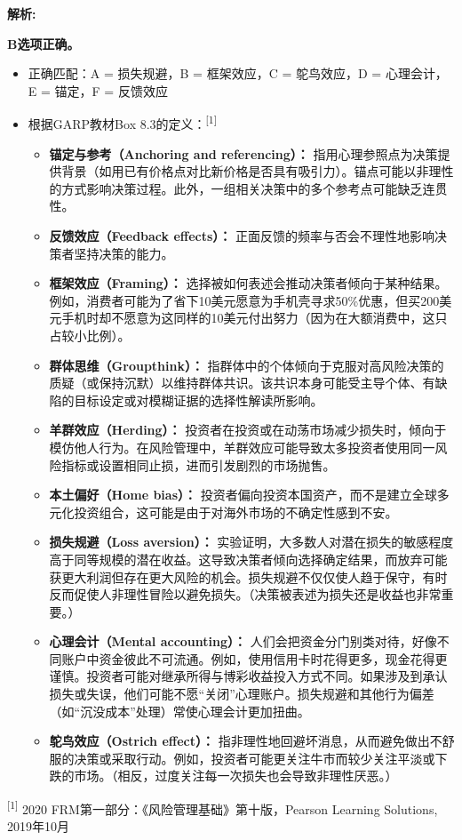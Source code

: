 \documentclass{article}
\newenvironment{explanation}
{\textbf{解析:}\par}
{\par}
\begin{document}
\begin{explanation}
    \textbf{B选项正确。} 
    \begin{itemize}
        \item 正确匹配：A = 损失规避，B = 框架效应，C = 鸵鸟效应，D = 心理会计，E = 锚定，F = 反馈效应
        \item 根据GARP教材Box 8.3的定义：\textsuperscript{[1]}
    
     \begin{itemize}
         \item \textbf{锚定与参考（Anchoring and referencing）：} 指用心理参照点为决策提供背景（如用已有价格点对比新价格是否具有吸引力）。锚点可能以非理性的方式影响决策过程。此外，一组相关决策中的多个参考点可能缺乏连贯性。
         \item \textbf{反馈效应（Feedback effects）：} 正面反馈的频率与否会不理性地影响决策者坚持决策的能力。
        
        \item \textbf{框架效应（Framing）：} 选择被如何表述会推动决策者倾向于某种结果。例如，消费者可能为了省下10美元愿意为手机壳寻求50\%优惠，但买200美元手机时却不愿意为这同样的10美元付出努力（因为在大额消费中，这只占较小比例）。
        \item \textbf{群体思维（Groupthink）：} 指群体中的个体倾向于克服对高风险决策的质疑（或保持沉默）以维持群体共识。该共识本身可能受主导个体、有缺陷的目标设定或对模糊证据的选择性解读所影响。
        \item \textbf{羊群效应（Herding）：} 投资者在投资或在动荡市场减少损失时，倾向于模仿他人行为。在风险管理中，羊群效应可能导致太多投资者使用同一风险指标或设置相同止损，进而引发剧烈的市场抛售。
        \item \textbf{本土偏好（Home bias）：} 投资者偏向投资本国资产，而不是建立全球多元化投资组合，这可能是由于对海外市场的不确定性感到不安。
        \item \textbf{损失规避（Loss aversion）：} 实验证明，大多数人对潜在损失的敏感程度高于同等规模的潜在收益。这导致决策者倾向选择确定结果，而放弃可能获更大利润但存在更大风险的机会。损失规避不仅仅使人趋于保守，有时反而促使人非理性冒险以避免损失。（决策被表述为损失还是收益也非常重要。）
        \item \textbf{心理会计（Mental accounting）：} 人们会把资金分门别类对待，好像不同账户中资金彼此不可流通。例如，使用信用卡时花得更多，现金花得更谨慎。投资者可能对继承所得与博彩收益投入方式不同。如果涉及到承认损失或失误，他们可能不愿“关闭”心理账户。损失规避和其他行为偏差（如“沉没成本”处理）常使心理会计更加扭曲。
        \item \textbf{鸵鸟效应（Ostrich effect）：} 指非理性地回避坏消息，从而避免做出不舒服的决策或采取行动。例如，投资者可能更关注牛市而较少关注平淡或下跌的市场。（相反，过度关注每一次损失也会导致非理性厌恶。）
    \end{itemize}
\end{itemize}
    \textsuperscript{[1]} 2020 FRM第一部分：《风险管理基础》第十版，Pearson Learning Solutions, 2019年10月

    
\end{explanation}
\end{document}
